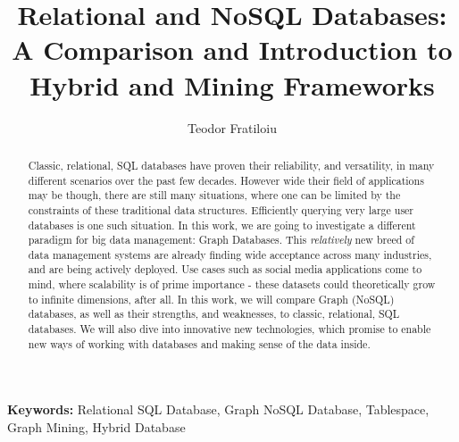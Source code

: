 \documentclass[10pt,        %
               a4paper,     %
               journal,     %
               ]{IEEEtran}
\makeatletter
\def\markboth#1#2{\def\leftmark{\@IEEEcompsoconly{\sffamily}\MakeUppercase{\protect#1}}%
\def\rightmark{\@IEEEcompsoconly{\sffamily}\MakeUppercase{\protect#2}}}
\makeatother
\begin{document}
\title{Relational and NoSQL Databases: A Comparison and Introduction to Hybrid and Mining Frameworks}

\author{Teodor Fratiloiu}%

\markboth{Scientific Seminar on Security in Information Technology, Winter Semester 2020/2021}%
{Teodor Fratiloiu: Comparison of SQL Relational Databases and NoSQL Graph Databases}

\maketitle


\begin{abstract}
Classic, relational, SQL databases have proven their reliability, and versatility, in many different scenarios over the past few decades. However wide their field of applications may be though, there are still many situations, where one can be limited by the constraints of these traditional data structures. Efficiently querying very large user databases is one such situation. In this work, we are going to investigate a different paradigm for  big data management: Graph Databases. This \textit{relatively} new breed of data management systems are already finding wide acceptance across many industries, and are being actively deployed. Use cases such as social media applications come to mind, where scalability is of prime importance - these datasets could theoretically grow to infinite dimensions, after all. In this work, we will compare Graph (NoSQL) databases, as well as their strengths, and weaknesses, to classic, relational, SQL databases. We will also dive into innovative new technologies, which promise to enable new ways of working with databases and making sense of the data inside.
\end{abstract}

\textbf{Keywords:} Relational SQL Database, Graph NoSQL Database, Tablespace, Graph Mining, Hybrid Database
\end{document}
